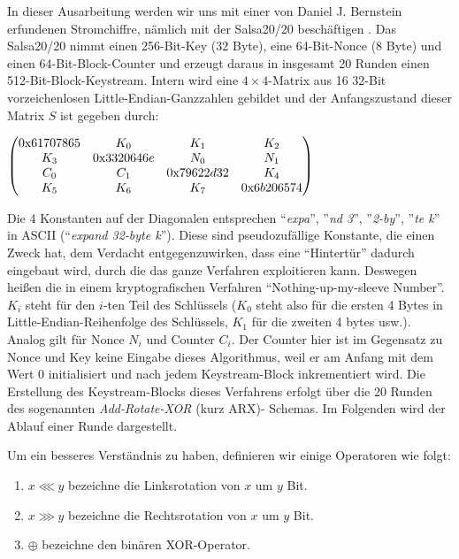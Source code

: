 \documentclass[course=erap]{aspdoc}
\begin{document}
In dieser Ausarbeitung werden wir uns mit einer von Daniel J. Bernstein erfundenen 
Stromchiffre, nämlich mit der Salsa20/20 beschäftigen \cite{bernstein2005salsa20}. Das Salsa20/20 nimmt einen 256-Bit-Key (32 Byte), eine 64-Bit-Nonce 
(8 Byte) und einen 64-Bit-Block-Counter und erzeugt daraus in insgesamt 20 Runden einen 
512-Bit-Block-Keystream. Intern wird eine \(4 \times 4\)-Matrix aus 16 32-Bit vorzeichenlosen 
Little-Endian-Ganzzahlen gebildet und der Anfangszustand dieser Matrix \(S\) ist gegeben durch: 
\vspace{0.5cm}
\begin{center}
\begin{math}
    \begin{pmatrix}
    0$x$61707865 & K_0 & K_1 & K_2\\
    K_3 & 0$x$3320646e & N_0 & N_1\\
    C_0 & C_1 & 0$x$79622d32 & K_4\\
    K_5 & K_6 & K_7 & 0$x$6b206574\\
    \end{pmatrix}
\end{math}
\end{center}
\vspace{0.5cm}

Die 4 Konstanten auf der Diagonalen entsprechen “\textit{expa}”, ”\textit{nd 3}”, ”\textit{2-by}”, ”\textit{te k}” in ASCII (“\textit{expand 32-byte k}”). Diese sind pseudozufällige Konstante, die einen Zweck hat, dem Verdacht entgegenzuwirken, dass eine “Hintertür” dadurch eingebaut wird, durch die das ganze Verfahren exploitieren kann. Deswegen heißen die in einem kryptografischen Verfahren “Nothing-up-my-sleeve Number”. \(K_i\) steht für den \(i\)-ten Teil des Schlüssels (\(K_0\) steht also für die ersten 4 Bytes in Little-Endian-Reihenfolge des Schlüssels, \(K_1\) für die zweiten 4 bytes usw.). Analog gilt für Nonce \(N_i\) und Counter \(C_i\). Der Counter hier ist im Gegensatz zu Nonce und Key keine Eingabe dieses Algorithmus, weil er am Anfang mit dem Wert \(0\) initialisiert und nach jedem Keystream-Block inkrementiert wird.
Die Erstellung des Keystream-Blocks dieses Verfahrens erfolgt über die 20 Runden des sogenannten \textit{Add-Rotate-XOR} (kurz ARX)- Schemas. Im Folgenden wird der Ablauf einer Runde dargestellt.

Um ein besseres Verständnis zu haben, definieren wir einige Operatoren wie folgt:

\begin{enumerate}
    \item \(x \lll y\) bezeichne die Linksrotation von \(x\) um \(y\) Bit.
    \item \(x \ggg y\) bezeichne die Rechtsrotation von \(x\) um \(y\) Bit.
    \item \(\oplus\) bezeichne den binären XOR-Operator.
\end{enumerate}
\end{document}
